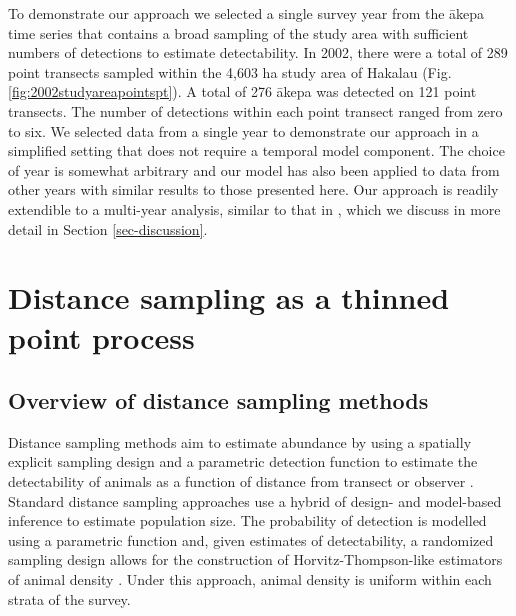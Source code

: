\documentclass{statsoc}
\newcommand{\akepa}{\textquotesingle\={a}kepa}  %
\begin{document}
To demonstrate our approach we selected a single survey year from the \akepa{} time series that contains a broad sampling of the study area with sufficient numbers of detections to estimate detectability. In 2002, there were a total of 289 point transects sampled within the 4,603 ha study area of Hakalau (Fig. \ref{fig:2002studyareapointspt}).  A total of 276 \akepa{} was detected on 121 point transects. The number of detections within each point transect ranged from zero to six. We selected data from a single year to demonstrate our approach in a simplified setting that does not require a temporal model component.  The choice of year is somewhat arbitrary and our model has also been applied to data from other years with similar results to those presented here.  Our approach is readily extendible to a multi-year analysis, similar to that in \cite{camp_dsm_2020}, which we discuss in more detail in Section \ref{sec-discussion}.

\section{Distance sampling as a thinned point process}
\label{sec-ds-pp}

\subsection{Overview of distance sampling methods}

Distance sampling methods aim to estimate abundance by using a spatially explicit sampling design and a parametric detection function to estimate the detectability of animals as a function of distance from transect or observer \citep{buckland_distance_2015}.  Standard distance sampling approaches use a hybrid of design- and model-based inference to estimate population size.  The probability of detection is modelled using a parametric function and, given estimates of detectability, a randomized sampling design allows for the construction of Horvitz-Thompson-like estimators of animal density \citep{ buckland_advanced_2004, horvitz_generalization_1952}.  Under this approach, animal density is uniform within each strata of the survey.  
\end{document}
